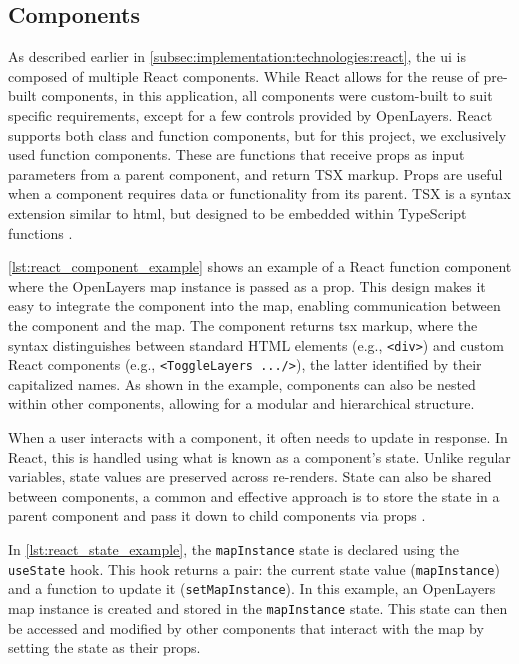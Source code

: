 \subsection{Components}

As described earlier in \autoref{subsec:implementation:technologies:react}, the \acrshort{ui} is composed of multiple React components. While React allows for the reuse of pre-built components, in this application, all components were custom-built to suit specific requirements, except for a few controls provided by OpenLayers. React supports both class and function components, but for this project, we exclusively used function components. These are functions that receive props as input parameters from a parent component, and return TSX markup. Props are useful when a component requires data or functionality from its parent. TSX is a syntax extension similar to \acrshort{html}, but designed to be embedded within TypeScript functions \cite{react_component}.

\autoref{lst:react_component_example} shows an example of a React function component where the OpenLayers map instance is passed as a prop. This design makes it easy to integrate the component into the map, enabling communication between the component and the map. The component returns tsx markup, where the syntax distinguishes between standard HTML elements (e.g., \texttt{<div>}) and custom React components (e.g., \texttt{<ToggleLayers .../>}), the latter identified by their capitalized names. As shown in the example, components can also be nested within other components, allowing for a modular and hierarchical structure.

\begin{figure}[h]

\end{figure}

When a user interacts with a component, it often needs to update in response. In React, this is handled using what is known as a component's state. Unlike regular variables, state values are preserved across re-renders. State can also be shared between components, a common and effective approach is to store the state in a parent component and pass it down to child components via props \cite{react_state}.

In \autoref{lst:react_state_example}, the \texttt{mapInstance} state is declared using the \texttt{useState} hook. This hook returns a pair: the current state value (\texttt{mapInstance}) and a function to update it (\texttt{setMapInstance}). In this example, an OpenLayers map instance is created and stored in the \texttt{mapInstance} state. This state can then be accessed and modified by other components that interact with the map by setting the state as their props.

